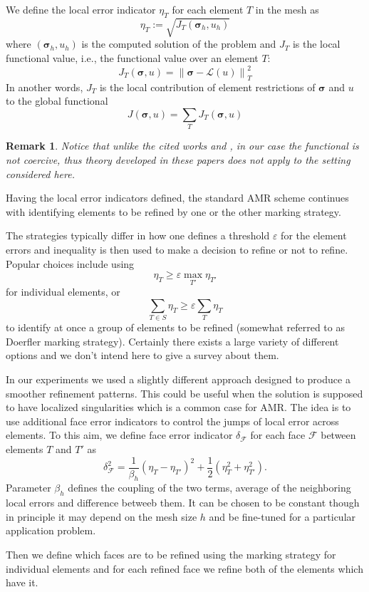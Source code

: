 \documentclass[a4paper,12pt]{amsart}
\numberwithin{equation}{section}
\newtheorem{remark}{Remark}[section]
\newcommand{\F}{{\mathcal F}}
\renewcommand{\L}{{\mathcal L}}
\def\bsigma{{\boldsymbol \sigma}}
\begin{document}
We define the local error indicator $\eta_{T}$ for each element $T$ in the mesh as
$$
\eta_{T} := \sqrt{J_{T}(\bsigma_h, u_h)}
$$
where $(\bsigma_h, u_h)$ is the computed solution of the problem and $J_{T}$ is the local functional value, i.e., the functional value over an element $T$:
$$
J_{T}(\bsigma,u) = \left\| \bsigma - \L(u) \right\|_{T}^2
$$
In another words, $J_{T}$ is the local contribution of element restrictions of $\bsigma$ and $u$ to the global functional
$$
J(\bsigma,u) = \sum_{T} J_{T}(\bsigma,u)
$$

\begin{remark}
Notice that unlike the cited works \cite{fosls_adapt} and \cite{fosls_adapt2}, in our case the functional is not coercive, thus theory developed in these papers does not apply to the setting considered here.
\end{remark}

Having the local error indicators defined, the standard AMR  scheme continues with identifying elements to be refined by one or the other marking strategy. 

The strategies typically differ in how one defines a threshold $\varepsilon$ for the element errors and inequality is then used to make a decision to refine or not to refine. Popular choices include using
$$
\eta_{T} \geq \varepsilon \max_{T'} \eta_{T'}
$$
for individual elements, or
$$
\sum_{T \in S} \eta_{T} \geq \varepsilon \sum_{T} \eta_{T}
$$
to identify at once a group of elements to be refined (somewhat referred to as Doerfler marking strategy). Certainly there exists a large variety of different options and we don't intend here to give a survey about them.

In our experiments we used a slightly different approach designed to produce a smoother refinement patterns. This could be useful when the solution is supposed to have localized singularities which is a common case for AMR. The idea is to use additional face error indicators to control the jumps of local error across elements.
To this aim, we define face error indicator $\delta_{\F}$ for each face $\F$ between elements $T$ and $T'$ as
$$
\delta_{\F}^2 = \frac{1}{\beta_h} (\eta_{T} - \eta_{T'})^2 + \frac{1}{2} (\eta_{T}^2 + \eta_{T'}^2).
$$
Parameter $\beta_h$ defines the coupling of the two terms, average of the neighboring local errors and difference betweeb them. It can be chosen to be constant though in principle it may depend on the mesh size $h$ and be fine-tuned for a particular application problem.

Then we define which faces are to be refined using the marking strategy for individual elements and for each refined face we refine both of the elements which have it.
\end{document}
